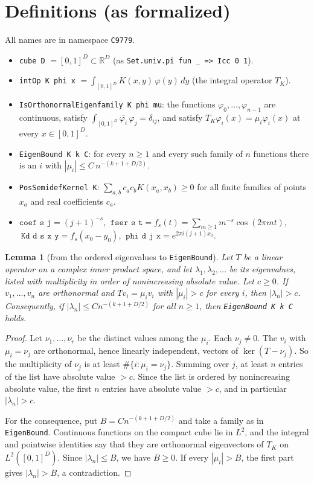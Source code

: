 \documentclass[11pt]{article}
\newtheorem{lemma}[theorem]{Lemma}
\theoremstyle{definition}
\theoremstyle{remark}
\begin{document}
\section{Definitions (as formalized)}

All names are in namespace \texttt{C9779}.
\begin{itemize}
\item \texttt{cube D} $=[0,1]^D\subset\mathbb R^D$ (as \texttt{Set.univ.pi fun \_ => Icc 0 1}).
\item \texttt{intOp K phi x} $=\int_{[0,1]^D}K(x,y)\,\varphi(y)\,dy$ (the integral operator $T_K$).
\item \texttt{IsOrthonormalEigenfamily K phi mu}: the functions $\varphi_0,\dots,\varphi_{n-1}$ are
  continuous, satisfy $\int_{[0,1]^D}\overline{\varphi_i}\,\varphi_j=\delta_{ij}$, and satisfy
  $T_K\varphi_i(x)=\mu_i\varphi_i(x)$ at every $x\in[0,1]^D$.
\item \texttt{EigenBound K k C}: for every $n\ge1$ and every such family of $n$ functions there is
  an $i$ with $|\mu_i|\le C\,n^{-(k+1+D/2)}$.
\item \texttt{PosSemidefKernel K}: $\sum_{a,b}c_ac_bK(x_a,x_b)\ge0$ for all finite families of points
  $x_a$ and real coefficients $c_a$.
\item $\texttt{coef s j}=(j+1)^{-s}$, $\ \texttt{fser s t}=f_s(t)=\sum_{m\ge1}m^{-s}\cos(2\pi mt)$,
  $\ \texttt{Kd d s x y}=f_s(x_0-y_0)$, $\ \texttt{phi d j x}=e^{2\pi i(j+1)x_0}$.
\end{itemize}

\begin{lemma}[from the ordered eigenvalues to \texttt{EigenBound}]\label{bridge}
Let $T$ be a linear operator on a complex inner product space, and let $\lambda_1,\lambda_2,\dots$ be
its eigenvalues, listed with multiplicity in order of nonincreasing absolute value. Let $c\ge0$. If
$v_1,\dots,v_n$ are orthonormal and $Tv_i=\mu_iv_i$ with $|\mu_i|>c$ for every $i$, then
$|\lambda_n|>c$. Consequently, if $|\lambda_n|\le C n^{-(k+1+D/2)}$ for all $n\ge1$, then
\texttt{EigenBound K k C} holds.
\end{lemma}
\begin{proof}
Let $\nu_1,\dots,\nu_r$ be the distinct values among the $\mu_i$. Each $\nu_j\ne0$. The $v_i$ with
$\mu_i=\nu_j$ are orthonormal, hence linearly independent, vectors of $\ker(T-\nu_j)$. So the
multiplicity of $\nu_j$ is at least $\#\{i:\mu_i=\nu_j\}$. Summing over $j$, at least $n$ entries of
the list have absolute value $>c$. Since the list is ordered by nonincreasing absolute value, the
first $n$ entries have absolute value $>c$, and in particular $|\lambda_n|>c$.

For the consequence, put $B=Cn^{-(k+1+D/2)}$ and take a family as in \texttt{EigenBound}. Continuous
functions on the compact cube lie in $L^2$, and the integral and pointwise identities say that they
are orthonormal eigenvectors of $T_K$ on $L^2([0,1]^D)$. Since $|\lambda_n|\le B$, we have $B\ge0$.
If every $|\mu_i|>B$, the first part gives $|\lambda_n|>B$, a contradiction.
\end{proof}
\end{document}
